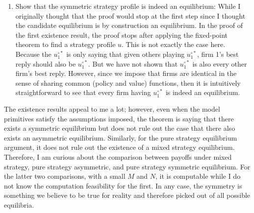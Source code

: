 \documentclass[12pt]{article}[margin=1in]
\begin{document}
\begin{enumerate}
\item Show that the symmetric strategy profile is indeed an equilibrium: While I originally thought that the proof would stop at the first step since I thought the candidate equilibrium is by construction an equilibrium. In the proof of the first existence result, the proof stops after applying the fixed-point theorem to find a strategy profile $u$. This is not exactly the case here. Because the $u_1^{\circ *}$ is only saying that given others playing $u_1^{\circ *}$, firm 1's best reply should also be $u_1^{\circ *}$. But we have not shown that $u_1^{\circ *}$ is also every other firm's best reply. However, since we impose that firms are identical in the sense of sharing common (policy and value) functions, then it is intuitively straightforward to see that every firm having $u_1^{\circ *}$ is indeed an equilibrium.
\end{enumerate}

The existence results appeal to me a lot; however, even when the model primitives satisfy the assumptions imposed, the theorem is saying that there exists a symmetric equilibrium but does not rule out the case that there also exists an asymmetric equilibrium. Similarly, for the pure strategy equilibrium argument, it does not rule out the existence of a mixed strategy equilibrium. Therefore, I am curious about the comparison between payoffs under mixed strategy, pure strategy asymmetric, and pure strategy symmetric equilibrium. For the latter two comparisons, with a small $M$ and $N$, it is computable while I do not know the computation feasibility for the first. In any case, the symmetry is something we believe to be true for reality and therefore picked out of all possible equilibria.

\pagebreak \newpage 
\end{document}
